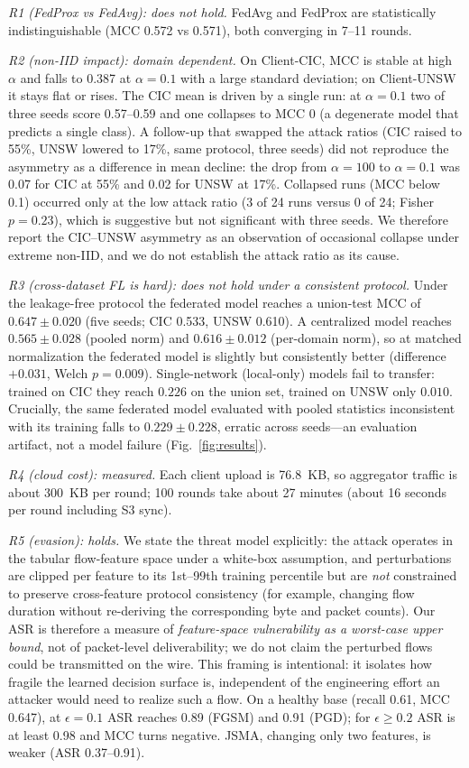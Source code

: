 \documentclass[conference,onecolumn]{IEEEtran}
\begin{document}
\textit{R1 (FedProx vs FedAvg): does not hold.} FedAvg and FedProx are statistically
indistinguishable (MCC 0.572 vs 0.571), both converging in 7--11 rounds.

\textit{R2 (non-IID impact): domain dependent.} On Client-CIC, MCC is stable at high $\alpha$ and
falls to 0.387 at $\alpha{=}0.1$ with a large standard deviation; on Client-UNSW it stays flat or
rises. The CIC mean is driven by a single run: at $\alpha{=}0.1$ two of three seeds score 0.57--0.59 and
one collapses to MCC 0 (a degenerate model that predicts a single class). A follow-up that swapped the
attack ratios (CIC raised to 55\%, UNSW lowered to 17\%, same protocol, three seeds) did not reproduce
the asymmetry as a difference in mean decline: the drop from $\alpha{=}100$ to $\alpha{=}0.1$ was 0.07
for CIC at 55\% and 0.02 for UNSW at 17\%. Collapsed runs (MCC below 0.1) occurred only at the low
attack ratio (3 of 24 runs versus 0 of 24; Fisher $p{=}0.23$), which is suggestive but not significant
with three seeds. We therefore report the CIC--UNSW asymmetry as an observation of occasional collapse
under extreme non-IID, and we do not establish the attack ratio as its cause.

\textit{R3 (cross-dataset FL is hard): does not hold under a consistent protocol.} Under the
leakage-free protocol the federated model reaches a union-test MCC of $0.647 \pm 0.020$ (five seeds;
CIC 0.533, UNSW 0.610). A centralized model reaches $0.565 \pm 0.028$ (pooled norm) and
$0.616 \pm 0.012$ (per-domain norm), so at matched normalization the federated model is slightly but
consistently better (difference $+0.031$, Welch $p{=}0.009$). Single-network (local-only) models fail
to transfer: trained on CIC they reach $0.226$ on the union set, trained on UNSW only $0.010$.
Crucially, the same federated model evaluated with pooled statistics inconsistent with its training
falls to $0.229 \pm 0.228$, erratic across seeds---an evaluation artifact, not a model failure
(Fig.~\ref{fig:results}).

\textit{R4 (cloud cost): measured.} Each client upload is 76.8~KB, so aggregator traffic is about
300~KB per round; 100 rounds take about 27 minutes (about 16 seconds per round including S3 sync).

\textit{R5 (evasion): holds.} We state the threat model explicitly: the attack operates in the
tabular flow-feature space under a white-box assumption, and perturbations are clipped per feature to
its 1st--99th training percentile but are \emph{not} constrained to preserve cross-feature protocol
consistency (for example, changing flow duration without re-deriving the corresponding byte and packet
counts). Our ASR is therefore a measure of \emph{feature-space vulnerability as a worst-case upper
bound}, not of packet-level deliverability; we do not claim the perturbed flows could be transmitted
on the wire. This framing is intentional: it isolates how fragile the learned decision surface is,
independent of the engineering effort an attacker would need to realize such a flow. On a healthy base
(recall 0.61, MCC 0.647), at $\epsilon{=}0.1$ ASR reaches 0.89 (FGSM) and 0.91 (PGD); for
$\epsilon{\geq}0.2$ ASR is at least 0.98 and MCC turns negative. JSMA, changing only two features, is
weaker (ASR 0.37--0.91).
\end{document}
